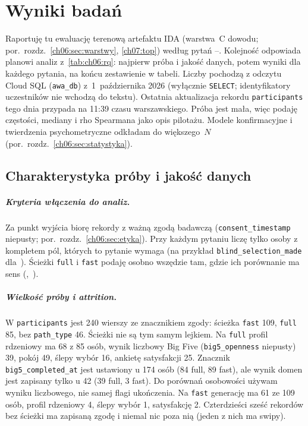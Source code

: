 \chapter{Wyniki badań}
\label{ch08:top}

Raportuję tu ewaluację terenową artefaktu IDA (warstwa~C dowodu; por.\ rozdz.~\ref{ch06:sec:warstwy}, \ref{ch07:top}) według pytań --.
Kolejność odpowiada planowi analiz z~\cref{tab:ch06:rq}: najpierw próba i jakość danych, potem wyniki dla każdego pytania, na końcu zestawienie w tabeli.
Liczby pochodzą z odczytu Cloud SQL (\texttt{awa\_db}) z~1~października 2026 (wyłącznie \texttt{SELECT}; identyfikatory uczestników nie wchodzą do tekstu).
Ostatnia aktualizacja rekordu \texttt{participants} tego dnia przypada na 11:39 czasu warszawskiego.
Próba jest mała, więc podaję częstości, mediany i rho Spearmana jako opis pilotażu. Modele konfirmacyjne i twierdzenia psychometryczne odkładam do większego~$N$ (por.\ rozdz.~\ref{ch06:sec:statystyka}).

\section{Charakterystyka próby i jakość danych}
\label{ch08:sec:proba}

\paragraph{Kryteria włączenia do analiz.}
Za punkt wyjścia biorę rekordy z ważną zgodą badawczą (\texttt{consent\_timestamp} niepusty; por.\ rozdz.~\ref{ch06:sec:etyka}). Przy każdym pytaniu liczę tylko osoby z kompletem pól, których to pytanie wymaga (na przykład \texttt{blind\_selection\_made} dla~).
Ścieżki \texttt{full} i \texttt{fast} podaję osobno wszędzie tam, gdzie ich porównanie ma sens (,~).

\paragraph{Wielkość próby i attrition.}
W \texttt{participants} jest 240 wierszy ze znacznikiem zgody: ścieżka \texttt{fast} 109, \texttt{full} 85, bez \texttt{path\_type} 46.
Ścieżki nie są tym samym lejkiem. Na \texttt{full} profil rdzeniowy ma 68 z 85 osób, wynik liczbowy Big Five (\texttt{big5\_openness} niepusty) 39, pokój 49, ślepy wybór 16, ankietę satysfakcji 25.
Znacznik \texttt{big5\_completed\_at} jest ustawiony u 174 osób (84 full, 89 fast), ale wynik domen jest zapisany tylko u 42 (39 full, 3 fast). Do porównań osobowości używam wyniku liczbowego, nie samej flagi ukończenia.
Na \texttt{fast} generację ma 61 ze 109 osób, profil rdzeniowy 4, ślepy wybór 1, satysfakcję 2. Czterdzieści sześć rekordów bez ścieżki ma zapisaną zgodę i niemal nic poza nią (jeden z nich ma swipy).

